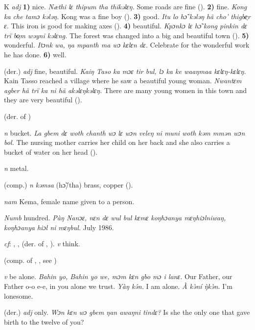 \begin{letter}{K}
 \textit{adj} \textbf{1)} nice. \textit{Næthi lɛ thipum tha thikəlɛŋ.} Some roads are fine (\citealt{Pichl1967}). \textbf{2)} fine. \textit{Kong ka che tamɔ kələŋ.} Kong was a fine boy (\citealt{Pichl1967}). \textbf{3)} good. \textit{Itu lo hɔ̃ kələŋ hã cho' thigbe̹r ɛ.} This iron is good for making axes (\citealt{Pichl1967}). \textbf{4)} beautiful. \textit{Kpɔnkɔ lɛ hɔ̃ kong pinkin dɛ trï bo̹m wəyni kəlɛng.} The forest was changed into a big and beautiful town (\citealt{Pichl1967}). \textbf{5)} wonderful. \textit{Itɔnk wa, ŋa mpanth ma wɔ kɛlɛn dɛ.} Celebrate for the wonderful work he has done. \textbf{6)} well.

 (der.) \textit{adj} fine, beautiful. \textit{Kaiŋ Taso ka mɔɛ tir bul, lɔ ka ke waaŋmaa kɛlɛŋ-kɛlɛŋ.} Kain Tasso reached a village where he saw a beautiful young woman. \textit{Nwantɛm agber hã trï ka ni hã akəlɛŋkəlɛŋ.} There are many young women in this town and they are very beautiful (\citealt{Pichl1967}). 

 (der. of ) 

 \textit{n} bucket. \textit{La gbem dɛ woth chanth wɔ lɛ wɔn veleŋ ni muni woth kəm mmən wɔn bol.} The nursing mother carries her child on her back and she also carries a bucket of water on her head (\citealt{Pichl1967}). 

 \textit{n} metal. 

 (comp.) \textit{n} \textit{kəmsa} (hɔ̃/tha) brass, copper (\citealt{Pichl1967}).

 \textit{nam} Kema, female name given to a person.

 \textit{Numb} hundred. \textit{Pàŋ Nanɔɛ, nɛn dɛ wul bul kɛmɛ koŋhɔanya mɛŋhiɔlniwaŋ, koŋhɔanya hiɔl ni mɛŋbul.} July 1986. 

 \textit{cf}: , ,  (der. of , ). \textit{v} think.

 (comp. of , , see ) 

 \textit{v} be alone. \textit{Bahin yo, Bahin yo we, mɔm kɛn gbo mɔ i lanɛ.} Our Father, our Father o-o e-e, in you alone we trust. \textit{Yàŋ kə́n.} I am alone. \textit{À kə̀ní \`{ŋ}kə̀n.} I'm lonesome.

 (der.) \textit{adj} only. \textit{Wɔn kɛn wɔ gbem ŋan awaŋni tindɛ?} Is she the only one that gave birth to the twelve of you?


\end{letter}
